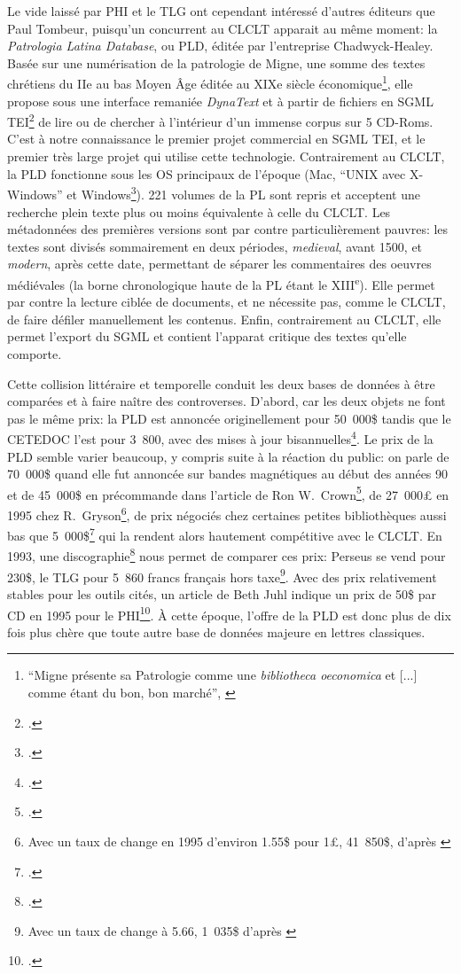 Le vide laissé par PHI et le TLG ont cependant intéressé d'autres éditeurs que Paul Tombeur, puisqu'un concurrent au CLCLT apparait au même moment: la \textit{Patrologia Latina Database}, ou PLD, éditée par l'entreprise Chadwyck-Healey. Basée sur une numérisation de la patrologie de Migne, une somme des textes chrétiens du IIe au bas Moyen Âge éditée au XIXe siècle économique\footnote{\enquote{Migne présente sa Patrologie comme une \textit{bibliotheca oeconomica} et {[...]} comme étant du bon, bon marché}, \cite[p. 228]{tombeur_pld_1993}}, elle propose sous une interface remaniée \textit{DynaText} et à partir de fichiers en SGML TEI\footcite{smith_dynatext_1993} de lire ou de chercher à l'intérieur d'un immense corpus sur 5 CD-Roms. C'est à notre connaissance le premier projet commercial en SGML TEI, et le premier très large projet qui utilise cette technologie. Contrairement au CLCLT, la PLD fonctionne sous les OS principaux de l'époque (Mac, \enquote{UNIX avec X-Windows} et Windows\footcite{smith_dynatext_1993}). 221 volumes de la PL sont repris et acceptent une recherche plein texte plus ou moins équivalente à celle du CLCLT. Les métadonnées des premières versions sont par contre particulièrement pauvres: les textes sont divisés sommairement en deux périodes, \textit{medieval}, avant 1500, et \textit{modern}, après cette date, permettant de séparer les commentaires des oeuvres médiévales (la borne chronologique haute de la PL étant le XIII\textsuperscript{e}). Elle permet par contre la lecture ciblée de documents, et ne nécessite pas, comme le CLCLT, de faire défiler manuellement les contenus. Enfin, contrairement au CLCLT, elle permet l'export du SGML et contient l'apparat critique des textes qu'elle comporte.

Cette collision littéraire et temporelle conduit les deux bases de données à être comparées et à faire naître des controverses. D'abord, car les deux objets ne font pas le même prix: la PLD est annoncée originellement pour 50~000\$ tandis que le CETEDOC l'est pour 3~800, avec des mises à jour bisannuelles\footcite{bucknall_review_1994}. Le prix de la PLD semble varier beaucoup, y compris suite à la réaction du public: on parle de 70~000\$ quand elle fut annoncée sur bandes magnétiques au début des années 90 et de 45~000\$ en précommande dans l'article de Ron W.~Crown\footcite{crown_comparing_2000}, de 27~000£ en 1995 chez R.~Gryson\footnote{Avec un taux de change en 1995 d'environ 1.55\$ pour 1£, 41~850\$, d'après \cite{noauthor_british_2021}}, de prix négociés chez certaines petites bibliothèques aussi bas que 5~000\$\footcite[Note 10, p.~108]{crown_comparing_2000} qui la rendent alors hautement compétitive avec le CLCLT. En 1993, une discographie\footcite{pellen_les_1993} nous permet de comparer ces prix: Perseus se vend pour 230\$, le TLG pour 5~860 francs français hors taxe\footnote{Avec un taux de change à 5.66, 1~035\$ d'après \cite{noauthor_france_nodate}}. Avec des prix relativement stables pour les outils cités, un article de Beth Juhl indique un prix de 50\$ par CD en 1995 pour le PHI\footcite{juhl_ex_1995}. À cette époque, l'offre de la PLD est donc plus de dix fois plus chère que toute autre base de données majeure en lettres classiques.

